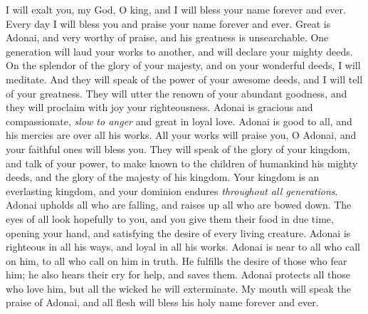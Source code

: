 \begin{biblechapter} %
 I will exalt you, my God, O king, 
and I will bless your name forever and ever.
\verse Every day I will bless you 
and praise your name forever and ever.
\verse Great is Adonai, and very worthy of praise, 
and his greatness is unsearchable.
\verse One generation will laud your works to another, 
and will declare your mighty deeds.
\verse On the splendor of the glory of your majesty, 
and on your wonderful deeds, I will meditate.
\verse And they will speak of the power of your awesome deeds, 
and I will tell of your greatness.
\verse They will utter  the renown of your abundant goodness, 
and they will proclaim with joy your righteousness.
\verse Adonai is gracious and compassionate, 
\textit{slow to anger} and great in loyal love.
\verse Adonai is good to all, 
and his mercies are over all his works.
\verse All your works will praise you, O Adonai, 
and your faithful ones will bless you.
\verse They will speak of the glory of your kingdom, 
and talk of your power,
\verse to make known to the children of humankind his mighty deeds, 
and the glory of the majesty of his kingdom.
\verse Your kingdom is an everlasting kingdom, 
and your dominion endures \textit{throughout all generations}.
\verse Adonai upholds all who are falling, 
and raises up all who are bowed down.
\verse The eyes of all look hopefully to you, 
and you give them their food in due time,
\verse opening your hand, 
and satisfying the desire of every living creature.
\verse Adonai is righteous in all his ways, 
and loyal in all his works.
\verse Adonai is near to all who call on him, 
to all who call on him in truth.
\verse He fulfills the desire of those who fear him; 
he also hears their cry for help, and saves them.
\verse Adonai protects all those who love him, 
but all the wicked he will exterminate.
\verse My mouth will speak the praise of Adonai, 
and all flesh will bless his holy name 
forever and ever.
\end{biblechapter}

